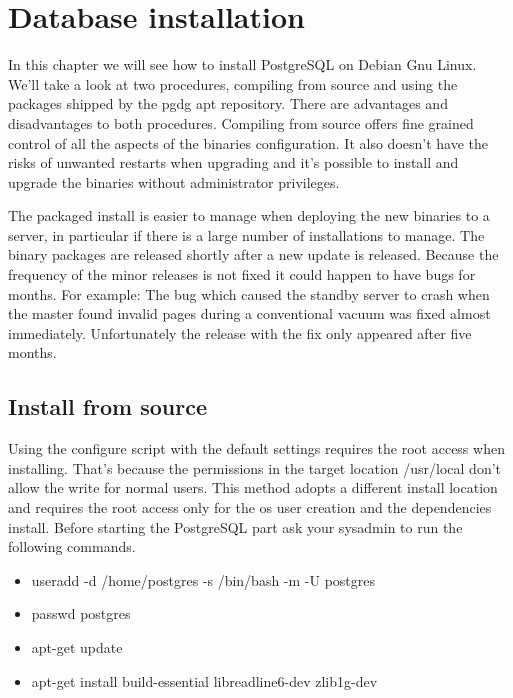 \chapter{Database installation}
\label{cha:DB_INSTALL}
In this chapter we will see how to install PostgreSQL on Debian Gnu Linux. We'll take a look at 
two procedures, compiling from source and using the packages shipped by the pgdg 
 apt repository.\newline 
There are advantages and disadvantages to both procedures. Compiling from source offers fine
grained control of all the aspects of the binaries configuration. It also doesn't have the risks of
unwanted restarts when upgrading and it's possible to install and upgrade the binaries without administrator privileges.\newline

The packaged install is easier to manage when deploying the new binaries to a server, in
particular if there is a large number of installations to manage. The binary packages are
released shortly after a new update is released. Because the frequency of the minor
releases is not fixed it could happen to have bugs for months.
For example: The bug which caused the standby server to crash when the master found invalid pages during
a conventional vacuum was fixed almost immediately. Unfortunately the release with the fix only
appeared after five months.\newline


\section{Install from source}
\label{sec:INSTSOURCE}
Using the configure script with the default settings requires the root access when installing.
That's because the permissions in the target location /usr/local don't allow the write for normal
users. This method adopts a different install location and requires the root access only for the os
user creation and the dependencies install. 
Before starting the PostgreSQL part ask your sysadmin to run the following commands.

\begin{itemize}

 \item useradd -d /home/postgres -s /bin/bash -m -U postgres
 \item passwd postgres 
 \item apt-get update
 \item apt-get install build-essential  libreadline6-dev  zlib1g-dev
\end{itemize}

